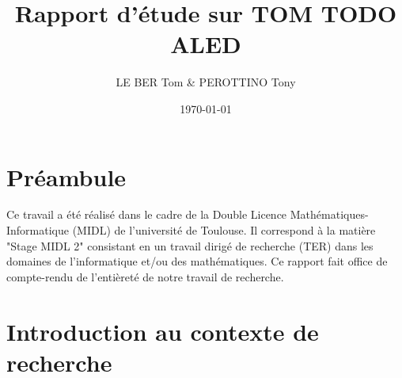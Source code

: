 \documentclass{article}
\title{Rapport d'étude sur TOM TODO ALED}
\author{LE BER Tom \& PEROTTINO Tony}
\date{\today}
\begin{document}
\maketitle

\newpage
\tableofcontents
\newpage

\section*{Préambule}
Ce travail a été réalisé dans le cadre de la Double Licence Mathématiques-Informatique (MIDL) de l'université de Toulouse.
Il correspond à la matière "Stage MIDL 2" consistant en un travail dirigé de recherche (TER) dans les domaines de l'informatique et/ou des mathématiques.
Ce rapport fait office de compte-rendu de l'entièreté de notre travail de recherche.

\section{Introduction au contexte de recherche}
\subsection{}
\end{document}
